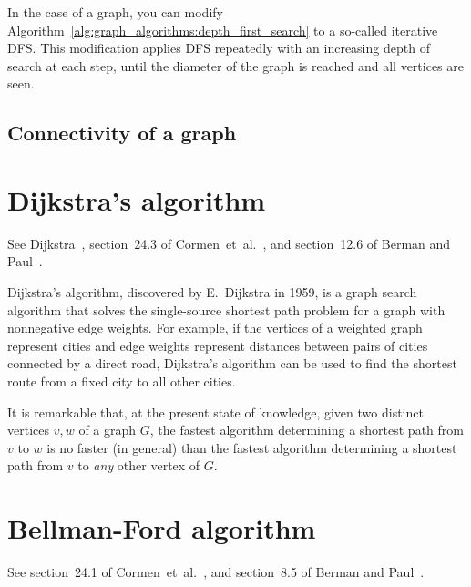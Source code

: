 In the case of a graph, you can modify
Algorithm~\ref{alg:graph_algorithms:depth_first_search} to a so-called
iterative DFS. This modification applies DFS repeatedly with an
increasing depth of search at each step, until the diameter of the
graph is reached and all vertices are seen.

\subsection{Connectivity of a graph}




\section{Dijkstra's algorithm}

See Dijkstra~\cite{Dijkstra1959}, section~24.3 of
Cormen~et~al.~\cite{CormenEtAl2001}, and section~12.6 of Berman and
Paul~\cite{BermanPaul1997}.

Dijkstra's algorithm, discovered by E.~Dijkstra in 1959, is a graph
search algorithm that solves the single-source shortest path problem
for a graph with nonnegative edge weights. For example, if the
vertices of a weighted graph represent cities and edge weights
represent distances between pairs of cities connected by a direct
road, Dijkstra's algorithm can be used to find the shortest route from
a fixed city to all other cities.

It is remarkable that, at the present state of knowledge, given two
distinct vertices $v, w$ of a graph $G$, the fastest algorithm
determining a shortest path from $v$ to $w$ is no faster (in general)
than the fastest algorithm determining a shortest path from $v$ to
\emph{any} other vertex of $G$.



\section{Bellman-Ford algorithm}

See section~24.1 of Cormen~et~al.~\cite{CormenEtAl2001}, and
section~8.5 of Berman and Paul~\cite{BermanPaul1997}.


